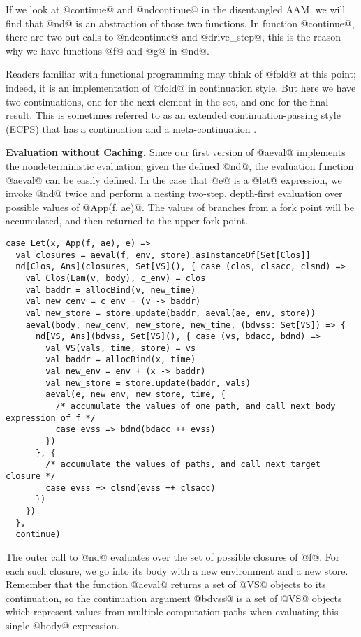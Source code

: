 \documentclass[acmsmall]{acmart}\settopmatter{}
\begin{document}
If we look at @continue@ and @ndcontinue@ in the disentangled AAM, we will find
that @nd@ is an abstraction of those two functions. In function @continue@,
there are two out calls to @ndcontinue@ and @drive_step@, this is the reason why
we have functions @f@ and @g@ in @nd@.

Readers familiar with functional programming may think of @fold@ at this point; indeed,
it is an implementation of @fold@ in continuation style. But here we have two
continuations, one for the next element in the set, and one for the final result.
This is sometimes referred to as an extended continuation-passing style (ECPS)
that has a continuation and a meta-continuation \cite{Danvy:1990:AC:91556.91622}.

\textbf{Evaluation without Caching.}
Since our first version of @aeval@ implements the nondeterministic
evaluation, given the defined @nd@, the evaluation function @aeval@ can be easily
defined. In the case that @e@ is a @let@ expression,
we invoke @nd@ twice and perform a nesting two-step, depth-first evaluation
over possible values of @App(f, ae)@.
The values of branches from a fork point will be accumulated, and then
returned to the upper fork point.

\begin{lstlisting}
case Let(x, App(f, ae), e) =>
  val closures = aeval(f, env, store).asInstanceOf[Set[Clos]]
  nd[Clos, Ans](closures, Set[VS](), { case (clos, clsacc, clsnd) =>
    val Clos(Lam(v, body), c_env) = clos
    val baddr = allocBind(v, new_time)
    val new_cenv = c_env + (v -> baddr)
    val new_store = store.update(baddr, aeval(ae, env, store))
    aeval(body, new_cenv, new_store, new_time, (bdvss: Set[VS]) => {
      nd[VS, Ans](bdvss, Set[VS](), { case (vs, bdacc, bdnd) =>
        val VS(vals, time, store) = vs
        val baddr = allocBind(x, time)
        val new_env = env + (x -> baddr)
        val new_store = store.update(baddr, vals)
        aeval(e, new_env, new_store, time, { 
          /* accumulate the values of one path, and call next body expression of f */
          case evss => bdnd(bdacc ++ evss) 
        })
      }, { 
        /* accumulate the values of paths, and call next target closure */
        case evss => clsnd(evss ++ clsacc) 
      })
    })
  },
  continue)
\end{lstlisting}

The outer call to @nd@ evaluates over the set of possible closures of
@f@. For each such closure, we go into its body with a new environment and a new store.
Remember that the function @aeval@ returns a set of @VS@ objects to its continuation,
so the continuation argument @bdvss@ is a set of @VS@ objects which represent values
from multiple computation paths when evaluating this single @body@ expression.
\end{document}
